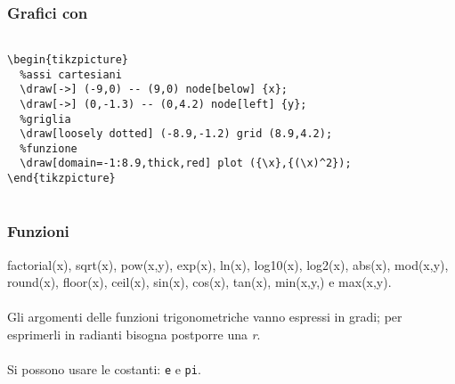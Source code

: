 \begin{frame}\centering
  \frametitle{Grafici con \Tikz}
  \begin{flushleft}
    \texttt{~\\
    \textbackslash{}begin\{tikzpicture\}\\
    ~~\%assi cartesiani\\
    ~~\textbackslash{}draw[-\textgreater{}] (-9,0) -\hspace{0.01mm}- (9,0) node[below] \{\textdollar{}x\textdollar{}\};
\\
    ~~\textbackslash{}draw[-\textgreater{}] (0,-1.3) -\hspace{0.01mm}- (0,4.2) node[left] \{\textdollar{}y\textdollar{}\};\\
    ~~\%griglia\\
    ~~\textbackslash{}draw[loosely dotted] (-8.9,-1.2) grid (8.9,4.2);\\
    ~~\%funzione
\\
    ~~\textbackslash{}draw[domain=-1:8.9,thick,red] plot (\{\textbackslash{}x\},\{(\textbackslash{}x)\^{}2\});
\\
    \textbackslash{}end\{tikzpicture\}\\~
    }
    \end{flushleft}
\end{frame}
\begin{frame}\centering
  \frametitle{Funzioni}
 factorial(x), sqrt(x), pow(x,y), exp(x), ln(x), log10(x), log2(x), abs(x), mod(x,y), round(x), floor(x), ceil(x), sin(x), cos(x), tan(x), min(x,y,) e max(x,y).\\~\\\pause
 Gli argomenti delle funzioni trigonometriche vanno espressi in gradi; per esprimerli in radianti bisogna postporre una \emph{r}.\\~\\\pause
 Si possono usare le costanti: \texttt{e} e \texttt{pi}.
\end{frame}


